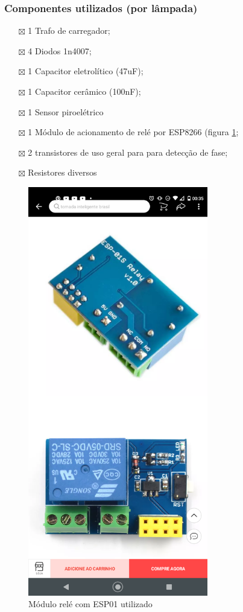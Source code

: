 \documentclass[11pt]{article}
\begin{document}
\subsubsection{Componentes utilizados (por lâmpada)}
\label{sec:org475f50f}
\begin{itemize}
\item[{$\boxtimes$}] 1 Trafo de carregador;
\item[{$\boxtimes$}] 4 Diodos 1n4007;
\item[{$\boxtimes$}] 1 Capacitor eletrolítico (47uF);
\item[{$\boxtimes$}] 1 Capacitor cerâmico (100nF);
\item[{$\boxtimes$}] 1 Sensor piroelétrico
\item[{$\boxtimes$}] 1 Módulo de acionamento de relé por ESP8266 (figura \ref{fig:module_esp01};
\item[{$\boxtimes$}] 2 transistores de uso geral para para detecção de fase;
\item[{$\boxtimes$}] Resistores diversos
\end{itemize}
\begin{figure}[h!]
\caption{\label{fig:module_esp01}Módulo relé com ESP01 utilizado}
\centering
\includegraphics[width=0.7\textwidth]{./module_esp01.png}
\end{figure}
\end{document}
